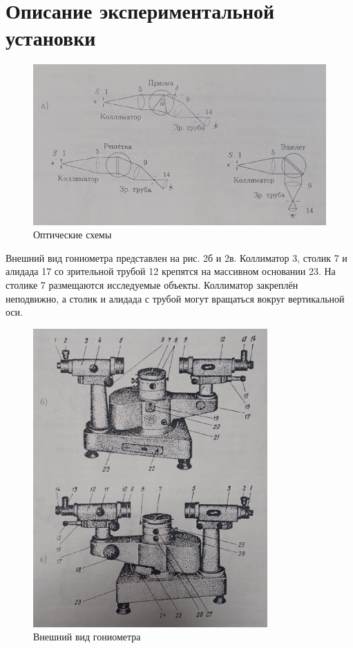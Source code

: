 \section*{Описание экспериментальной установки}

\begin{figure}[H]
	\centering
	\includegraphics[width=1\textwidth]{../Изображения/Оптические схемы.jpeg}
	\caption{Оптические схемы}
\end{figure}

Внешний вид гониометра представлен на рис. 2б и 2в. Коллиматор 3, столик 7 и алидада 17 со зрительной трубой 12 крепятся на массивном основании 23. На столике 7 размещаются исследуемые объекты. Коллиматор закреплён неподвижно, а столик и алидада с трубой могут вращаться вокруг вертикальной оси.

\begin{figure}[H]
	\centering
	\includegraphics[width=0.8\textwidth]{../Изображения/Внешний вид гониометра.jpeg}
	\caption{Внешний вид гониометра}
\end{figure}

